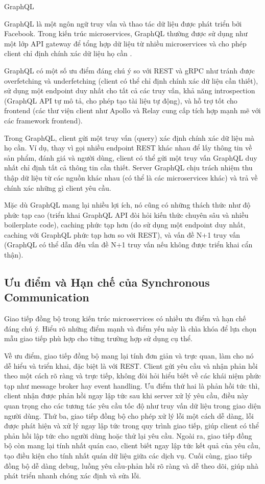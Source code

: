 GraphQL

GraphQL là một ngôn ngữ truy vấn và thao tác dữ liệu được phát triển bởi Facebook. Trong kiến trúc microservices, GraphQL thường được sử dụng như một lớp API gateway để tổng hợp dữ liệu từ nhiều microservices và cho phép client chỉ định chính xác dữ liệu họ cần \cite{wittern2018}.

GraphQL có một số ưu điểm đáng chú ý so với REST và gRPC như tránh được overfetching và underfetching (client có thể chỉ định chính xác dữ liệu cần thiết), sử dụng một endpoint duy nhất cho tất cả các truy vấn, khả năng introspection (GraphQL API tự mô tả, cho phép tạo tài liệu tự động), và hỗ trợ tốt cho frontend (các thư viện client như Apollo và Relay cung cấp tích hợp mạnh mẽ với các framework frontend).

Trong GraphQL, client gửi một truy vấn (query) xác định chính xác dữ liệu mà họ cần. Ví dụ, thay vì gọi nhiều endpoint REST khác nhau để lấy thông tin về sản phẩm, đánh giá và người dùng, client có thể gửi một truy vấn GraphQL duy nhất chỉ định tất cả thông tin cần thiết. Server GraphQL chịu trách nhiệm thu thập dữ liệu từ các nguồn khác nhau (có thể là các microservices khác) và trả về chính xác những gì client yêu cầu.

Mặc dù GraphQL mang lại nhiều lợi ích, nó cũng có những thách thức như độ phức tạp cao (triển khai GraphQL API đòi hỏi kiến thức chuyên sâu và nhiều boilerplate code), caching phức tạp hơn (do sử dụng một endpoint duy nhất, caching với GraphQL phức tạp hơn so với REST), và vấn đề N+1 truy vấn (GraphQL có thể dẫn đến vấn đề N+1 truy vấn nếu không được triển khai cẩn thận).

\subsection{Ưu điểm và Hạn chế của Synchronous Communication}
Giao tiếp đồng bộ trong kiến trúc microservices có nhiều ưu điểm và hạn chế đáng chú ý. Hiểu rõ những điểm mạnh và điểm yếu này là chìa khóa để lựa chọn mẫu giao tiếp phù hợp cho từng trường hợp sử dụng cụ thể.

Về ưu điểm, giao tiếp đồng bộ mang lại tính đơn giản và trực quan, làm cho nó dễ hiểu và triển khai, đặc biệt là với REST. Client gửi yêu cầu và nhận phản hồi theo một cách rõ ràng và trực tiếp, không đòi hỏi hiểu biết về các khái niệm phức tạp như message broker hay event handling. Ưu điểm thứ hai là phản hồi tức thì, client nhận được phản hồi ngay lập tức sau khi server xử lý yêu cầu, điều này quan trọng cho các tương tác yêu cầu tốc độ như truy vấn dữ liệu trong giao diện người dùng. Thứ ba, giao tiếp đồng bộ cho phép xử lý lỗi một cách dễ dàng, lỗi được phát hiện và xử lý ngay lập tức trong quy trình giao tiếp, giúp client có thể phản hồi lập tức cho người dùng hoặc thử lại yêu cầu. Ngoài ra, giao tiếp đồng bộ còn mang lại tính nhất quán cao, client biết ngay lập tức kết quả của yêu cầu, tạo điều kiện cho tính nhất quán dữ liệu giữa các dịch vụ. Cuối cùng, giao tiếp đồng bộ dễ dàng debug, luồng yêu cầu-phản hồi rõ ràng và dễ theo dõi, giúp nhà phát triển nhanh chóng xác định và sửa lỗi.

